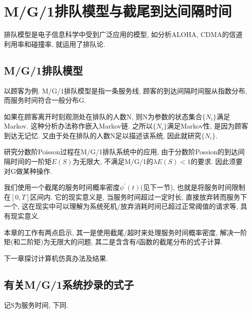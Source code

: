 \documentclass[a4paper, 12pt]{ctexart}
\begin{document}
\section{M/G/1排队模型与截尾到达间隔时间}
排队模型是电子信息科学中受到广泛应用的模型, 如分析ALOHA, CDMA的信道利用率和碰撞率, 就运用了排队论.
\subsection{M/G/1排队模型}

以顾客为例. M/G/1排队模型是指一条服务线, 顾客的到达间隔时间服从指数分布, 而服务时间符合一般分布G.

如果在顾客离开时刻观测处在排队的人数N,  则N为参数的状态集合$\{N_i\}$满足Markov. 这种分析办法称作嵌入Markov链\cite{16}. 之所以$\{N_i\}$满足Markov性, 是因为顾客到达无记忆. 又由于处在排队的人数N足以描述该系统, 因此就研究$\{N_i\}$.

研究分数阶Poisson过程在M/G/1排队系统中的应用, 由于分数阶Possion的到达间隔时间的一阶矩$E(S)$为无限大, 不满足M/G/1的$\lambda E(S)<1$的要求. 因此须要对G做某种操作.

我们使用一个截尾的服务时间概率密度$\psi ^\prime (t)$(见下一节), 也就是将服务时间限制在$[0,T]$区间内. 它的现实意义是, 当服务时间超过一定时长, 直接放弃转而服务下一个, 这在现实中可以理解为系统死机/放弃消耗时间已超过正常阈值的请求等, 具有现实意义.

本章的工作有两点启示, 其一是使用截尾/超时来处理服务时间概率密度, 解决一阶矩(和二阶矩)为无限大的问题, 其二是含含有$\delta $函数的截尾分布的式子计算.

下一章探讨计算机仿真办法及结果.
\subsection{有关M/G/1系统抄录的式子}
记S为服务时间, 下同.
\end{document}
